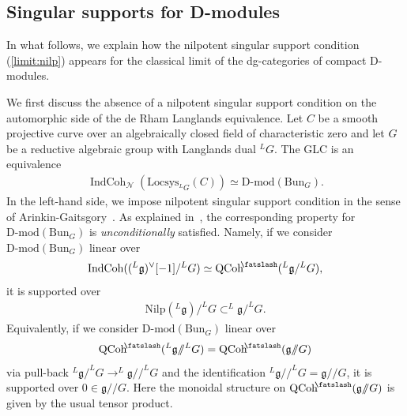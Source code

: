 \documentclass [11pt,oneside,a4paper,mathscr]{amsart}
\theoremstyle{definition}
\newcommand{\QCoh}{\operatorname{QCoh}}
\newcommand{\IndCoh}{\operatorname{IndCoh}}
\newcommand{\shear}{{\mathbin{\mkern-6mu\fatslash}}}
\newcommand{\ssslash}{/\!\!/}
\newcommand{\Bun}{\mathrm{Bun}}
\begin{document}
\subsection{Singular supports for D-modules}\label{sec:ssupport}
In what follows, we explain how the nilpotent singular support condition (\ref{limit:nilp}) appears 
for the classical limit of the dg-categories of compact D-modules. 

We first discuss the absence of a nilpotent singular support condition on the automorphic side of the de Rham Langlands equivalence. 
Let $C$ be a smooth projective curve over an algebraically closed field of characteristic zero and let $G$ be a reductive algebraic 
group with Langlands dual $^{L}G$. 
The GLC is an equivalence 
\begin{align*}
\IndCoh_{\mathcal{N}}(\mathrm{Locsys}_{^{L}G}(C)) \simeq 
\text{D-mod}(\Bun_{G}). 
\end{align*}
In the left-hand side, we impose nilpotent singular 
support condition in the sense of Arinkin-Gaitsgory~\cite{AG}. 
As explained in~\cite[Remark 12.8.8]{AG}, the corresponding property for 
$\text{D-mod}(\Bun_{G})$ is \textit{unconditionally} satisfied. Namely, if 
we consider $\text{D-mod}(\Bun_{G})$ linear over 
\begin{align*}
    \IndCoh((^{L}\mathfrak{g})^{\vee}[-1]/^{L}G) \simeq \QCoh^{\shear}(^{L}\mathfrak{g}/^{L}G), 
\end{align*}
it is supported over 
\begin{align}\label{nil:supp}
    \mathrm{Nilp}(^{L}\mathfrak{g})/^{L}G \subset ^{L}\mathfrak{g}/^{L}G. 
\end{align}
Equivalently, if we consider $\text{D-mod}(\Bun_{G})$ linear over 
\begin{align*}
\QCoh^{\shear}(^{L}\mathfrak{g}\ssslash ^{L}G)=\QCoh^{\shear}(\mathfrak{g}\ssslash G)
\end{align*}
via pull-back $^{L}\mathfrak{g}/^{L}G \to ^{L}\mathfrak{g}\ssslash ^{L}G$ and the identification 
$^{L}\mathfrak{g}\ssslash ^{L}G=\mathfrak{g}\ssslash G$, it is supported over 
$0 \in \mathfrak{g}\ssslash G$. 
Here the monoidal structure on $\QCoh^{\shear}(\mathfrak{g}\ssslash G)$
is given by the usual tensor product. 
\end{document}
